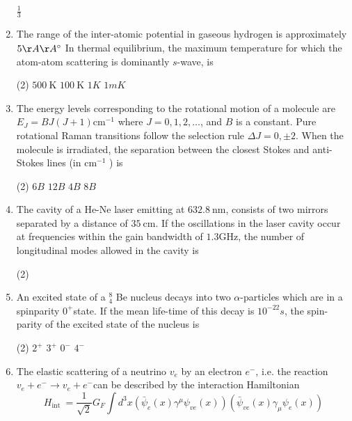 \begin{enumerate}
\begin{tasks}
	\task[\textbf{d.}] $\frac{1}{3}$
\end{tasks}
\item The range of the inter-atomic potential in gaseous hydrogen is approximately $5 \AA \AA^{\circ}$ In thermal equilibrium, the maximum temperature for which the atom-atom scattering is dominantly $s$-wave, is
 \begin{tasks}(2)
	\task[\textbf{a.}]$500 \mathrm{~K}$
	\task[\textbf{b.}]$100 \mathrm{~K}$
	\task[\textbf{c.}] $1 K$
	\task[\textbf{d.}] $1 m K$
\end{tasks}
\item The energy levels corresponding to the rotational motion of a molecule are $E_{J}=B J(J+1) \mathrm{cm}^{-1}$ where $J=0,1,2, \ldots$, and $B$ is a constant. Pure rotational Raman transitions follow the selection rule $\Delta J=0, \pm 2$. When the molecule is irradiated, the separation between the closest Stokes and anti-Stokes lines (in $\mathrm{cm}^{-1}$ ) is
 \begin{tasks}(2)
	\task[\textbf{a.}] $6 B$
	\task[\textbf{b.}]$12 B$
	\task[\textbf{c.}]$4 B$
	\task[\textbf{d.}]$8 B$ 
\end{tasks}
\item The cavity of a He-Ne laser emitting at $632.8 \mathrm{~nm}$, consists of two mirrors separated by a distance of $35 \mathrm{~cm}$. If the oscillations in the laser cavity occur at frequencies within the gain bandwidth of $1.3 \mathrm{GHz}$, the number of longitudinal modes allowed in the cavity is
 \begin{tasks}(2)
\end{tasks}
\item An excited state of a ${ }_{4}^{8}$ Be nucleus decays into two $\alpha$-particles which are in a spinparity $0^{+}$state. If the mean life-time of this decay is $10^{-22} s$, the spin-parity of the excited state of the nucleus is
 \begin{tasks}(2)
	\task[\textbf{a.}]$2^{+}$
	\task[\textbf{b.}]$3^{+}$
	\task[\textbf{c.}]$0^{-}$
	\task[\textbf{d.}]$4^{-}$ 
\end{tasks}
\item The elastic scattering of a neutrino $v_{e}$ by an electron $e^{-}$, i.e. the reaction $v_{e}+e^{-} \rightarrow v_{e}+e^{-}$can be described by the interaction Hamiltonian
$$
H_{\text {int }}=\frac{1}{\sqrt{2}} G_{F} \int d^{3} x\left(\bar{\psi}_{e}(x) \gamma^{\mu} \psi_{v e}(x)\right)\left(\bar{\psi}_{v e}(x) \gamma_{\mu} \psi_{e}(x)\right)
$$
\end{enumerate}
